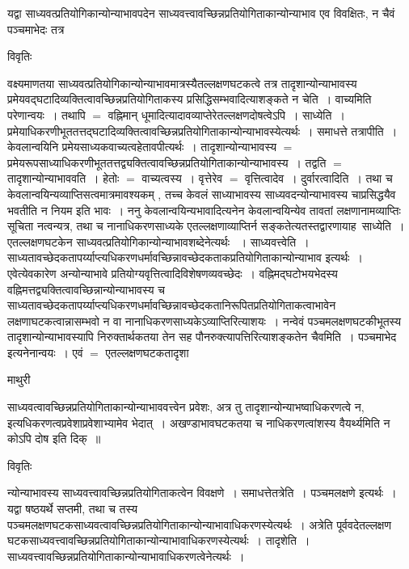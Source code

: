 \documentclass[10pt, openany]{book}
\begin{document}
{{यद्वा {\vpc साध्यवत्प्रतियोगिकान्योन्याभावपदेन }साध्यवत्त्वावच्छिन्नप्रतियोगिताकान्योन्याभाव एव विवक्षितः, न चैवं पञ्चमाभेदः तत्र }
\begin{center}     विवृतिः \end{center}
वक्ष्यमाणतया साध्यवत्प्रतियोगिकान्योन्याभावमात्रस्यैतल्लक्षणघटकत्वे तत्र तादृशान्योन्याभावस्य प्रमेयवद्घटादिव्यक्तित्वावच्छिन्नप्रतियोगिताकस्य
प्रसिद्धिसम्भवादित्याशङ्कते {\la न चेति~।} वाच्यमिति परेणान्वयः~। तथापि $=$ वह्निमान् धूमादित्यादावव्याप्तेरेतल्लक्षणदोषत्वेऽपि~। {\la साध्येति~।}
प्रमेयाधिकरणीभूततत्तद्घटादिव्यक्तित्वावच्छिन्नप्रतियोगिताकान्योन्याभावस्येत्यर्थः~। समाधत्ते  {\la तत्रापीति~।} केवलान्वयिनि प्रमेयसाध्यकवाच्यत्वहेतावपीत्यर्थः~। तादृशान्योन्याभावस्य $=$ प्रमेयरूपसाध्याधिकरणीभूततत्तद्व्यक्तित्वावच्छिन्नप्रतियोगिताकान्योन्याभावस्य~। तद्वति $=$तादृशान्योन्याभाववति~। हेतोः $=$ वाच्यत्वस्य~। वृत्तेरेव $=$ वृत्तित्वादेव~। दुर्वारत्वादिति~। तथा च केवलान्वयिन्यव्याप्तिसत्वमात्रमावश्यकम् , तच्च केवलं
साध्याभावस्य साध्यवदन्योन्याभावस्य चाप्रसिद्धयैव भवतीति न नियम इति भावः~। ननु केवलान्वयिन्यभावादित्यनेन केवलान्वयिन्येव तावतां लक्षणानामव्याप्तिः
सूचिता नत्वन्यत्र, तथा च नानाधिकरणसाध्यके एतल्लक्षणाव्याप्तिर्न सङ्कतेत्यतस्तद्वारणायाह~{\la साध्येति~।} एतल्लक्षणघटकेन
साध्यवत्प्रतियोगिकान्योन्याभावशब्देनेत्यर्थः ~। साध्यवत्त्वेति~। साध्यतावच्छेदकतापर्य्याप्त्यधिकरणधर्मावच्छिन्नावच्छेदकताकप्रतियोगिताकान्योन्याभाव इत्यर्थः~। एवेत्येवकारेण अन्योन्याभावे प्रतियोग्यवृत्तित्वादिविशेषणव्यवच्छेदः~। वह्निमद्घटोभयभेदस्य वह्निमत्तद्व्यक्तित्वावच्छिन्नान्योन्याभावस्य च
साध्यतावच्छेदकतापर्य्याप्त्यधिकरणधर्मावच्छिन्नावच्छेदकतानिरूपितप्रतियोगिताकत्वाभावेन लक्षणाघटकत्वान्नासम्भवो न वा नानाधिकरणसाध्यकेऽव्याप्तिरित्याशयः~। नन्वेवं पञ्चमलक्षणघटकीभूतस्य तादृशान्योन्याभावस्यापि निरुक्तार्थकतया तेन सह पौनरुक्त्यापत्तिरित्याशङ्कतेन {\la चैवमिति~।} {\qt पञ्चमाभेद} इत्यनेनान्वयः~। एवं $=$ एतल्लक्षणघटकतादृशा
\newpage
 \begin{center}  माथुरी  \end{center} 
{\la साध्यवत्वावच्छिन्नप्रतियोगिताकान्योन्याभाववत्त्वेन प्रवेशः, अत्र तु तादृशान्योन्याभष्वाधिकरणत्वे  न, इत्यधिकरणत्वप्रवेशाप्रवेशाभ्यामेव भेदात्~। अखण्डाभावघटकतया च नाधिकरणत्वांशस्य वैयर्थ्यमिति न कोऽपि दोष इति दिक्~॥~}
\begin{center}     विवृतिः \end{center}
न्योन्याभावस्य साध्यवत्त्वावच्छिन्नप्रतियोगिताकत्वेन विवक्षणे~। समाधत्तेतत्रेति~। पञ्चमलक्षणे इत्यर्थः~। यद्वा षष्ठयर्थे सप्तमी, तथा च तस्य पञ्चमलक्षणघटकसाध्यवत्वावच्छिन्नप्रतियोगिताकान्योन्याभावाधिकरणस्येत्यर्थः~। अत्रेति \textendash  पूर्ववदेतल्लक्षण घटकसाध्यवत्त्वावच्छिन्नप्रतियोगिताकान्योन्याभावाधिकरणस्येत्यर्थः~। {\la तादृशेति~।} साध्यवत्त्वावच्छिन्नप्रतियोगिताकान्योन्याभावाधिकरणत्वेनेत्यर्थः~।
}
\end{document}

